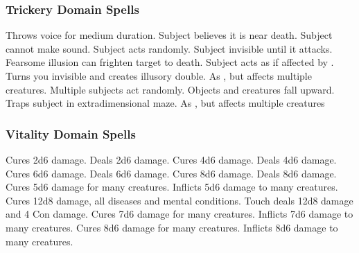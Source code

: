 \subsubsection{Trickery Domain Spells}

\begin{spelllist}
  \spellhead[1]{}
   Throws voice for medium duration.
   Subject believes it is near death.
   Subject cannot make sound.
   Subject acts randomly.
   Subject invisible until it attacks.
  \spellhead[4]{}
   Fearsome illusion can frighten target to death.
  \spellhead[5]{}
   Subject acts as if affected by .
   Turns you invisible and creates illusory double.
  \spellhead[6]{}
   As , but affects multiple creatures.
   Multiple subjects act randomly.
  \spellhead[8]{}
   Objects and creatures fall upward.
   Traps subject in extradimensional maze.
   As , but affects multiple creatures
\end{spelllist}

\subsubsection{Vitality Domain Spells}

\begin{spelllist}
   Cures 2d6 damage.
   Deals 2d6 damage.
   Cures 4d6 damage.
   Deals 4d6 damage.
   Cures 6d6 damage.
   Deals 6d6 damage.
   Cures 8d6 damage.
   Deals 8d6 damage.
   Cures 5d6 damage for many creatures.
   Inflicts 5d6 damage to many creatures.
   Cures 12d8 damage, all diseases and mental conditions.
   Touch deals 12d8 damage and 4 Con damage.
   Cures 7d6 damage for many creatures.
   Inflicts 7d6 damage to many creatures.
   Cures 8d6 damage for many creatures.
   Inflicts 8d6 damage to many creatures.
  \spellhead[9]{}
  \spellhead[9]{}
\end{spelllist}

